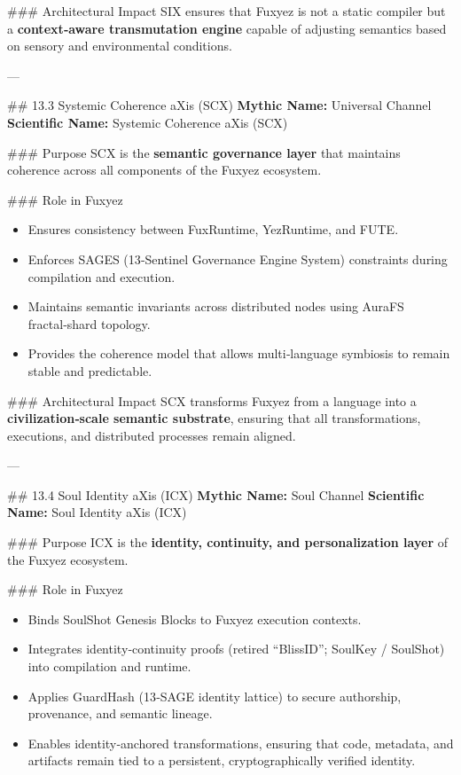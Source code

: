 \documentclass[12pt, a4paper]{book}
\begin{document}
\#\#\# Architectural Impact  
SIX ensures that Fuxyez is not a static compiler but a \textbf{context‑aware transmutation engine} capable of adjusting semantics based on sensory and environmental conditions.

---

\#\# 13.3 Systemic Coherence aXis (SCX)  
\textbf{Mythic Name:} Universal Channel  
\textbf{Scientific Name:} Systemic Coherence aXis (SCX)

\#\#\# Purpose  
SCX is the \textbf{semantic governance layer} that maintains coherence across all components of the Fuxyez ecosystem.

\#\#\# Role in Fuxyez  
\begin{itemize}
  \item Ensures consistency between FuxRuntime, YezRuntime, and FUTE.  
  \item Enforces SAGES (13‑Sentinel Governance Engine System) constraints during compilation and execution.  
  \item Maintains semantic invariants across distributed nodes using AuraFS fractal‑shard topology.  
  \item Provides the coherence model that allows multi‑language symbiosis to remain stable and predictable.
\end{itemize}

\#\#\# Architectural Impact  
SCX transforms Fuxyez from a language into a \textbf{civilization‑scale semantic substrate}, ensuring that all transformations, executions, and distributed processes remain aligned.

---

\#\# 13.4 Soul Identity aXis (ICX)  
\textbf{Mythic Name:} Soul Channel  
\textbf{Scientific Name:} Soul Identity aXis (ICX)

\#\#\# Purpose  
ICX is the \textbf{identity, continuity, and personalization layer} of the Fuxyez ecosystem.

\#\#\# Role in Fuxyez  
\begin{itemize}
  \item Binds SoulShot Genesis Blocks to Fuxyez execution contexts.  
  \item Integrates identity‑continuity proofs (retired ``BlissID''; SoulKey / SoulShot) into compilation and runtime.  
  \item Applies GuardHash (13‑SAGE identity lattice) to secure authorship, provenance, and semantic lineage.  
  \item Enables identity‑anchored transformations, ensuring that code, metadata, and artifacts remain tied to a persistent, cryptographically verified identity.
\end{itemize}
\end{document}
